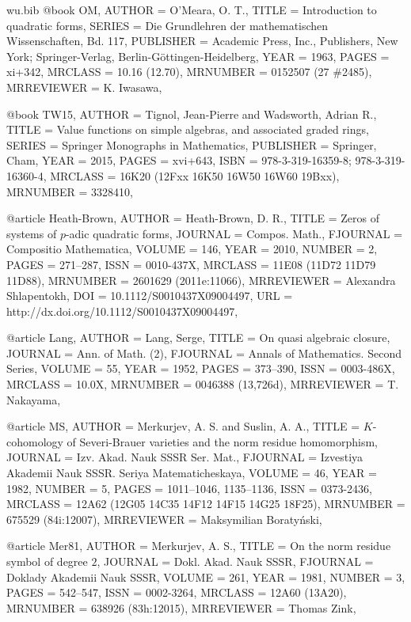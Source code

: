 \documentclass{amsart}
\numberwithin{equation}{section}
\theoremstyle{plain}
\theoremstyle{definition}
\begin{document}
\begin{filecontents}{wu.bib}
@book {OM,
    AUTHOR = {O'Meara, O. T.},
     TITLE = {Introduction to quadratic forms},
    SERIES = {Die Grundlehren der mathematischen Wissenschaften, Bd. 117},
 PUBLISHER = {Academic Press, Inc., Publishers, New York; Springer-Verlag,
              Berlin-G\"ottingen-Heidelberg},
      YEAR = {1963},
     PAGES = {xi+342},
   MRCLASS = {10.16 (12.70)},
  MRNUMBER = {0152507 (27 \#2485)},
MRREVIEWER = {K. Iwasawa},
}

@book {TW15,
    AUTHOR = {Tignol, Jean-Pierre and Wadsworth, Adrian R.},
     TITLE = {Value functions on simple algebras, and associated graded
              rings},
    SERIES = {Springer Monographs in Mathematics},
 PUBLISHER = {Springer, Cham},
      YEAR = {2015},
     PAGES = {xvi+643},
      ISBN = {978-3-319-16359-8; 978-3-319-16360-4},
   MRCLASS = {16K20 (12Fxx 16K50 16W50 16W60 19Bxx)},
  MRNUMBER = {3328410},
}

@article {Heath-Brown,
    AUTHOR = {Heath-Brown, D. R.},
     TITLE = {Zeros of systems of {$p$}-adic quadratic forms},
   JOURNAL = {Compos. Math.},
  FJOURNAL = {Compositio Mathematica},
    VOLUME = {146},
      YEAR = {2010},
    NUMBER = {2},
     PAGES = {271--287},
      ISSN = {0010-437X},
   MRCLASS = {11E08 (11D72 11D79 11D88)},
  MRNUMBER = {2601629 (2011e:11066)},
MRREVIEWER = {Alexandra Shlapentokh},
       DOI = {10.1112/S0010437X09004497},
       URL = {http://dx.doi.org/10.1112/S0010437X09004497},
}

@article {Lang,
	AUTHOR = {Lang, Serge},
	TITLE = {On quasi algebraic closure},
	JOURNAL = {Ann. of Math. (2)},
	FJOURNAL = {Annals of Mathematics. Second Series},
	VOLUME = {55},
	YEAR = {1952},
	PAGES = {373--390},
	ISSN = {0003-486X},
	MRCLASS = {10.0X},
	MRNUMBER = {0046388 (13,726d)},
	MRREVIEWER = {T. Nakayama},
}

@article {MS,
    AUTHOR = {Merkurjev, A. S. and Suslin, A. A.},
     TITLE = {{$K$}-cohomology of {S}everi-{B}rauer varieties and the norm
              residue homomorphism},
   JOURNAL = {Izv. Akad. Nauk SSSR Ser. Mat.},
  FJOURNAL = {Izvestiya Akademii Nauk SSSR. Seriya Matematicheskaya},
    VOLUME = {46},
      YEAR = {1982},
    NUMBER = {5},
     PAGES = {1011--1046, 1135--1136},
      ISSN = {0373-2436},
   MRCLASS = {12A62 (12G05 14C35 14F12 14F15 14G25 18F25)},
  MRNUMBER = {675529 (84i:12007)},
MRREVIEWER = {Maksymilian Boraty{\'n}ski},
}

@article {Mer81,
    AUTHOR = {Merkurjev, A. S.},
     TITLE = {On the norm residue symbol of degree {$2$}},
   JOURNAL = {Dokl. Akad. Nauk SSSR},
  FJOURNAL = {Doklady Akademii Nauk SSSR},
    VOLUME = {261},
      YEAR = {1981},
    NUMBER = {3},
     PAGES = {542--547},
      ISSN = {0002-3264},
   MRCLASS = {12A60 (13A20)},
  MRNUMBER = {638926 (83h:12015)},
MRREVIEWER = {Thomas Zink},
}


\end{filecontents}
\end{document}
